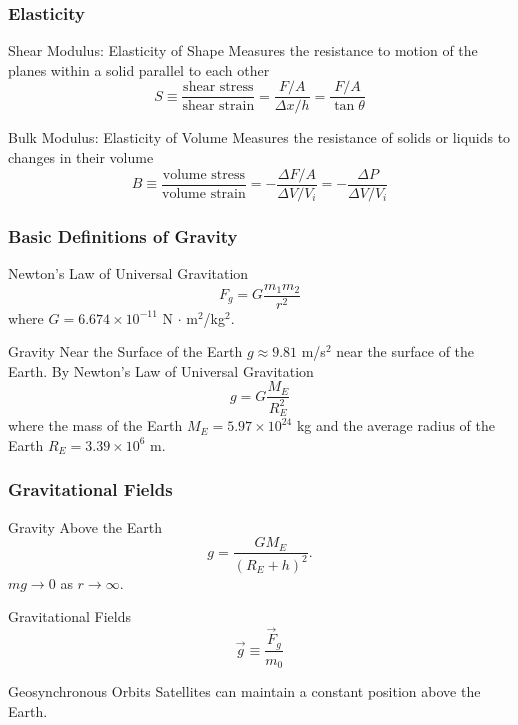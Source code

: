 \documentclass[letterpaper]{beamer}
\begin{document}
\begin{frame}
\frametitle{Elasticity}

\begin{block}{Shear Modulus: Elasticity of Shape}
Measures the resistance to motion of the planes within a solid parallel to each other
$$S \equiv \frac{\text{shear stress}}{\text{shear strain}} = \frac{F/A}{\Delta x/h} = \frac{F/A}{\tan\theta}$$
\end{block}

\begin{block}{Bulk Modulus: Elasticity of Volume}
Measures the resistance of solids or liquids to changes in their volume
$$B \equiv \frac{\text{volume stress}}{\text{volume strain}} = -\frac{\Delta F/A}{\Delta V/V_i} = -\frac{\Delta P}{\Delta V/V_i}$$
\end{block}
\end{frame}

\begin{frame}
\frametitle{Basic Definitions of Gravity}
\begin{block}{Newton's Law of Universal Gravitation}
$$F_g = G \frac{m_1m_2}{r^2}$$ where $G = 6.674 \times 10^{-11}$ N $\cdot$ m$^2$/kg$^2$.
\end{block}

\begin{block}{Gravity Near the Surface of the Earth}
$g \approx 9.81$ m/s$^2$ near the surface of the Earth. By Newton's Law of Universal Gravitation $$g=G\frac{M_E}{R_E^2}$$ where the mass of the Earth $M_E = 5.97 \times 10^{24}$ kg and the average radius of the Earth $R_E = 3.39 \times 10^6$ m.
\end{block}

\end{frame}

\begin{frame}
\frametitle{Gravitational Fields}

\begin{block}{Gravity Above the Earth}
$$g = \frac{GM_E}{\left(R_E+h\right)^2}.$$ $mg \to 0$ as $r \to \infty$.
\end{block}

\begin{block}{Gravitational Fields}
$$\vec{g} \equiv \frac{\vec{F}_g}{m_0}$$
\end{block}

\begin{block}{Geosynchronous Orbits}
Satellites can maintain a constant position above the Earth.
\end{block}
\end{frame}
\end{document}
